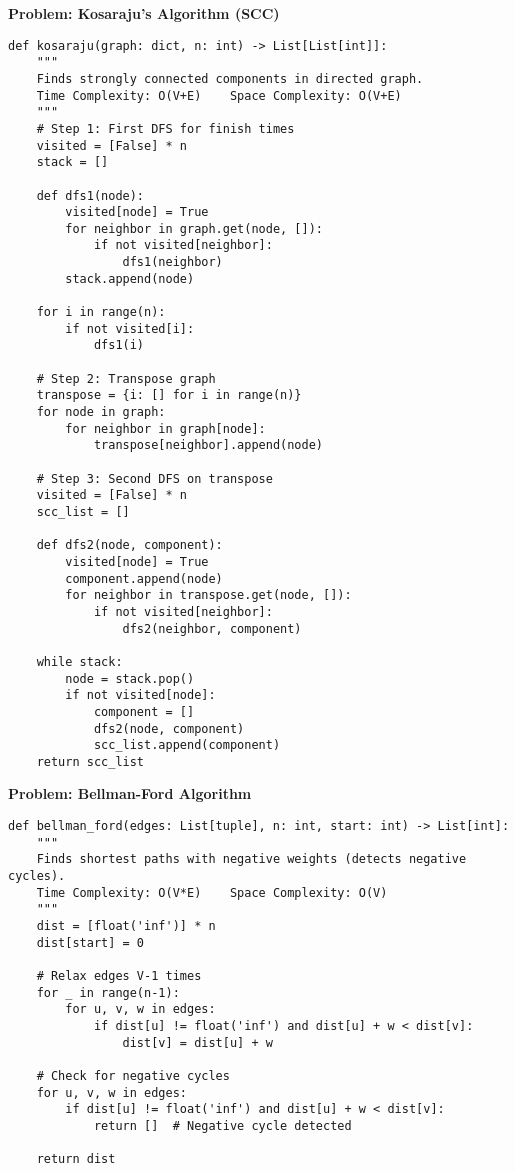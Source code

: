 \noindent\textbf{Problem: Kosaraju's Algorithm (SCC)}
\begin{verbatim}
def kosaraju(graph: dict, n: int) -> List[List[int]]:
    """
    Finds strongly connected components in directed graph.
    Time Complexity: O(V+E)    Space Complexity: O(V+E)
    """
    # Step 1: First DFS for finish times
    visited = [False] * n
    stack = []
    
    def dfs1(node):
        visited[node] = True
        for neighbor in graph.get(node, []):
            if not visited[neighbor]:
                dfs1(neighbor)
        stack.append(node)
    
    for i in range(n):
        if not visited[i]:
            dfs1(i)
    
    # Step 2: Transpose graph
    transpose = {i: [] for i in range(n)}
    for node in graph:
        for neighbor in graph[node]:
            transpose[neighbor].append(node)
    
    # Step 3: Second DFS on transpose
    visited = [False] * n
    scc_list = []
    
    def dfs2(node, component):
        visited[node] = True
        component.append(node)
        for neighbor in transpose.get(node, []):
            if not visited[neighbor]:
                dfs2(neighbor, component)
    
    while stack:
        node = stack.pop()
        if not visited[node]:
            component = []
            dfs2(node, component)
            scc_list.append(component)
    return scc_list
\end{verbatim}

\noindent\textbf{Problem: Bellman-Ford Algorithm}
\begin{verbatim}
def bellman_ford(edges: List[tuple], n: int, start: int) -> List[int]:
    """
    Finds shortest paths with negative weights (detects negative cycles).
    Time Complexity: O(V*E)    Space Complexity: O(V)
    """
    dist = [float('inf')] * n
    dist[start] = 0
    
    # Relax edges V-1 times
    for _ in range(n-1):
        for u, v, w in edges:
            if dist[u] != float('inf') and dist[u] + w < dist[v]:
                dist[v] = dist[u] + w
    
    # Check for negative cycles
    for u, v, w in edges:
        if dist[u] != float('inf') and dist[u] + w < dist[v]:
            return []  # Negative cycle detected
    
    return dist
\end{verbatim}


